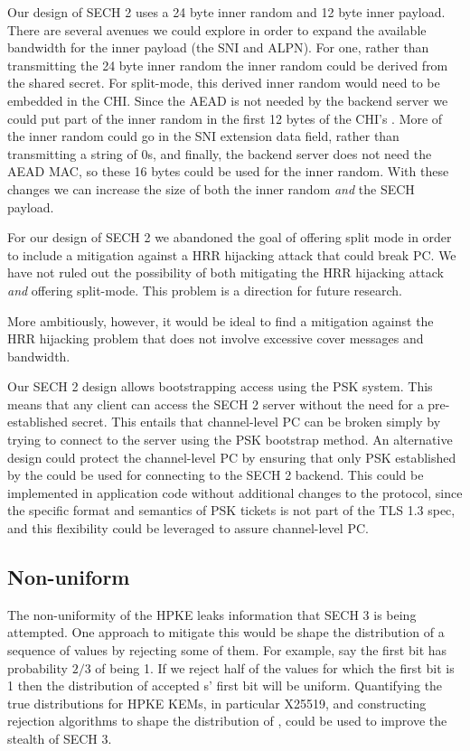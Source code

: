 Our design of \ac{SECH} 2 uses a 24 byte inner random and 12 byte inner payload.
There are several avenues we could explore in order to expand the available bandwidth for the inner payload (the \ac{SNI} and \ac{ALPN}).
For one, rather than transmitting the 24 byte inner random the inner random could be derived from the shared secret.
For split-mode, this derived inner random would need to be embedded in the \ac{CHI}.
Since the \ac{AEAD} \nonce is not needed by the backend server we could put part of the inner random in the first 12 bytes of the \ac{CHI}'s .
More of the inner random could go in the \ac{SNI} extension data field, rather than transmitting a string of 0s, and finally,
the backend server does not need the \ac{AEAD} \ac{MAC}, so these 16 bytes could be used for the inner random.
With these changes we can increase the size of both the inner random {\em and} the \ac{SECH} payload.

For our design of \ac{SECH} 2 we abandoned the goal of offering
split mode in order to include a mitigation
against a \ac{HRR} hijacking attack that could break \ac{PC}.
We have not ruled out the possibility of both mitigating the
\ac{HRR} hijacking attack {\em and} offering split-mode.
This problem is a direction for future research.

More ambitiously, however, it would be ideal to find
a mitigation against the \ac{HRR} hijacking problem that
does not involve excessive cover messages and bandwidth.

Our \ac{SECH} 2 design allows bootstrapping access using the \ac{PSK} system.
This means that any client can access
the \ac{SECH} 2 server without the need for a
pre-established secret.
This entails that channel-level \ac{PC} can be broken simply by trying to connect to the server using the \ac{PSK} bootstrap method.
An alternative design could protect the channel-level \ac{PC} by ensuring that only \ac{PSK} established by the \varsechlongtermkey{}
could be used for connecting to the \ac{SECH} 2 backend.
This could be implemented in application code
without additional changes to the protocol,
since the specific format and semantics of \ac{PSK} tickets is not part of the \ac{TLS} 1.3 spec,
and this flexibility could be leveraged to
assure channel-level \ac{PC}.

\subsection{Non-uniform }

The non-uniformity of the \ac{HPKE}  leaks
information that \ac{SECH} 3 is being attempted.
One approach to mitigate this would be shape the distribution
of a sequence of  values by rejecting some of them.
For example, say the first bit has probability $2/3$ of being 1.
If we reject half of the  values for which the first bit is 1
then the distribution of accepted s' first bit will be uniform.
Quantifying the true distributions for \ac{HPKE} \ac{KEM}s,
in particular \ac{X25519},
and constructing rejection algorithms to shape the distribution of ,
could be used to improve the stealth of \ac{SECH} 3.

